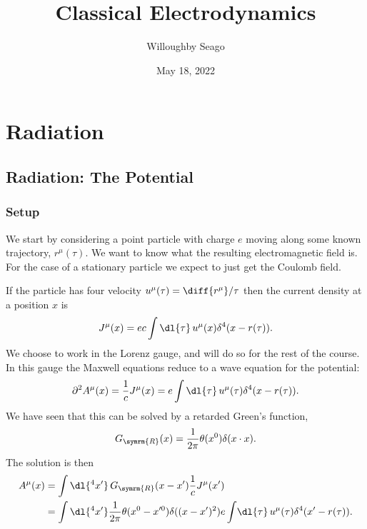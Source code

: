 \documentclass[fleqn]{NotesClass}
\title{Classical Electrodynamics}
\author{Willoughby Seago}
\date{May 18, 2022}
\newcommand*{\dalembertian}{\partial^2}
\begin{document}
    \frontmatter
    \titlepage
    \innertitlepage{}
    \tableofcontents
    \listoffigures
    \mainmatter
    
    
    
    
    
    
    \part{Radiation}
    \chapter{Radiation: The Potential}
    \section{Setup}
    We start by considering a point particle with charge \(e\) moving along some known trajectory, \(r^\mu(\tau)\).
    We want to know what the resulting electromagnetic field is.
    For the case of a stationary particle we expect to just get the Coulomb field.
    
    If the particle has four velocity \(u^\mu(\tau) = \diff{r^\mu}/{\tau}\) then the current density at a position \(x\) is
    \begin{equation}
        J^\mu(x) = ec \int \dl{\tau} \, u^\mu(x) \delta^4(x - r(\tau)).
    \end{equation}
    We choose to work in the Lorenz gauge, and will do so for the rest of the course.
    In this gauge the Maxwell equations reduce to a wave equation for the potential:
    \begin{equation}
        \dalembertian A^\mu(x) = \frac{1}{c}J^\mu(x) = e\int \dl{\tau} \, u^\mu(\tau) \delta^4(x - r(\tau)).
    \end{equation}
    We have seen that this can be solved by a retarded Green's function,
    \begin{equation}
        G_{\symrm{R}}(x) = \frac{1}{2\pi} \theta(x^0) \delta(x\cdot x).
    \end{equation}
    The solution is then
    \begin{align}
        A^\mu(x) &= \int \dl{^4x'} \, G_{\symrm{R}}(x - x') \frac{1}{c}J^\mu(x')\\
        &= \int \dl{^4x'} \frac{1}{2\pi} \theta(x^0 - x'^0) \delta((x - x')^2) e \int \! \dl{\tau} \, u^\mu(\tau) \delta^4(x' - r(\tau)).
    \end{align}
    
\end{document}
